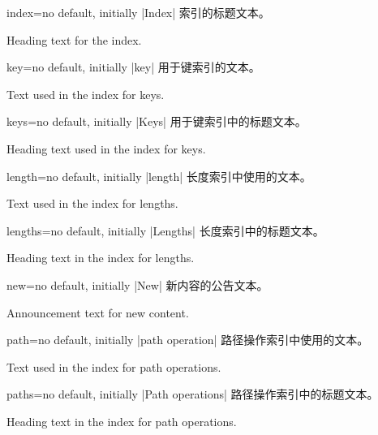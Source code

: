 \begin{langTcbKey}{index}{=}{no default, initially |Index|}
索引的标题文本。

Heading text for the index.
\end{langTcbKey}

\begin{langTcbKey}{key}{=}{no default, initially |key|}
用于键索引的文本。

Text used in the index for keys.
\end{langTcbKey}

\begin{langTcbKey}{keys}{=}{no default, initially |Keys|}
用于键索引中的标题文本。

Heading text used in the index for keys.
\end{langTcbKey}

\begin{langTcbKey}[][doc new={2015-01-08}]{length}{=}{no default, initially |length|}
长度索引中使用的文本。

Text used in the index for lengths.
\end{langTcbKey}

\begin{langTcbKey}[][doc new={2015-01-08}]{lengths}{=}{no default, initially |Lengths|}
长度索引中的标题文本。

Heading text in the index for lengths.
\end{langTcbKey}

\begin{langTcbKey}[][doc new={2014-09-19}]{new}{=}{no default, initially |New|}
新内容的公告文本。

Announcement text for new content.
\end{langTcbKey}

\begin{langTcbKey}[][doc new={2019-09-18}]{path}{=}{no default, initially |path operation|}
路径操作索引中使用的文本。

Text used in the index for path operations.
\end{langTcbKey}

\begin{langTcbKey}[][doc new={2019-09-18}]{paths}{=}{no default, initially |Path operations|}
路径操作索引中的标题文本。

Heading text in the index for path operations.
\end{langTcbKey}

